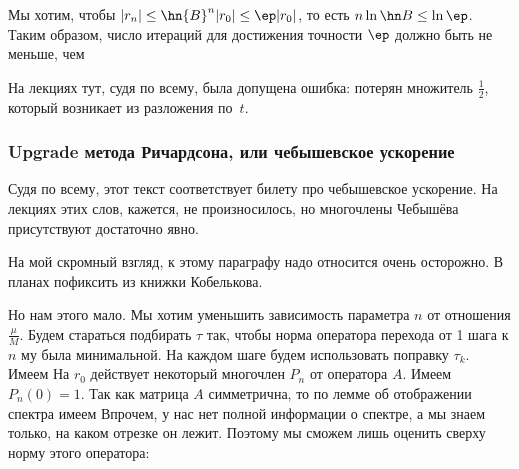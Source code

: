 \documentclass[a4paper]{article}
\begin{document}
Мы хотим, чтобы $|r_n| \le \hn{B}^n |r_0| \le \ep |r_0|$, то есть
$n\ln \hn B \le \ln \ep$.  Таким образом, число итераций для
достижения точности $\ep$ должно быть не меньше, чем 

\begin{petit}
На лекциях тут, судя по всему, была допущена ошибка: потерян множитель
$\frac12$, который возникает из разложения по~$t$.
\end{petit}

\subsubsection{Upgrade метода Ричардсона, или чебышевское ускорение}

\begin{petit}
Судя по всему, этот текст соответствует билету про чебышевское
ускорение. На лекциях этих слов, кажется, не произносилось, но
многочлены Чебышёва присутствуют достаточно явно.
\end{petit}
\begin{petit}
  На мой скромный взгляд, к этому параграфу надо относится
  очень осторожно. В планах пофиксить из книжки Кобелькова.
\end{petit}

Но нам этого мало. Мы хотим уменьшить зависимость параметра $n$ от
отношения $\frac{\mu}{M}$.  Будем стараться подбирать $\tau$ так,
чтобы норма оператора перехода от 1 шага к $n$ му была минимальной.
На каждом шаге будем использовать поправку $\tau_k$.  Имеем   На $r_0$
действует некоторый многочлен $P_n$ от оператора $A$. Имеем
$P_n(0)=1$.  Так как матрица $A$ симметрична, то по лемме об
отображении спектра имеем   Впрочем, у нас нет полной информации о спектре, а мы
знаем только, на каком отрезке он лежит.  Поэтому мы сможем лишь
оценить сверху норму этого оператора: 
\end{document}
